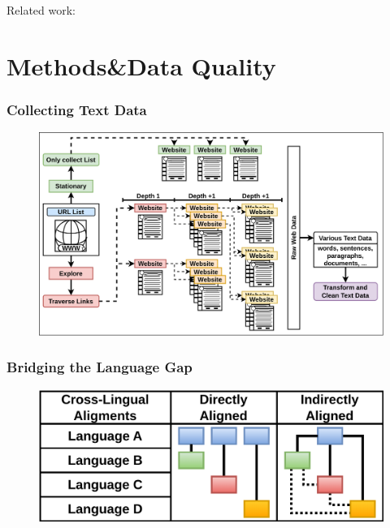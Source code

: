 \documentclass[aspectratio=169]{beamer}
\begin{document}
\begin{frame}[fragile]
    \vspace{0.6cm}
    \begin{minipage}{1.0\textwidth}
    \centering
    \footnotesize
    Related work: \citep{chen2022ApproachingNeuralChinese, lei2021LeveragingZipfsLaw, xie2023CCMBLargescaleChinese, zhang2013ForcedAlignmentApproach, li2024BetterChinesecentricNeural, zhang2024NeuralMachineTranslation, dadparvar2024OrientalWhispersUnveiling}
    \end{minipage}
\end{frame}


\section{Methods\&Data Quality}

\begin{frame}[fragile]
	\frametitle{Collecting Text Data}
    \begin{figure}
	    \centering
	    \includegraphics[width=.8\textwidth]{images/CRAMT-Tool-CollectWebdata.png}
	\end{figure}
\end{frame}

\begin{frame}[fragile]
	\frametitle{Bridging the Language Gap}
    \begin{figure}
	    \centering
	    \includegraphics[width=1.0\textwidth]{images/CRAMT-Tool-TextAlignmentsOverviewMulti.png}
	\end{figure}
\end{frame}
\end{document}
